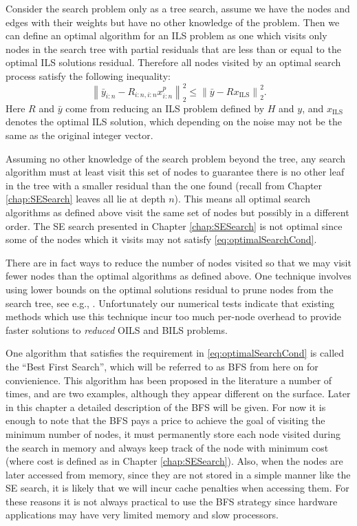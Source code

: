\documentclass[12pt,Bold,letterpaper]{mcgilletdclass}
\begin{document}
Consider the search problem only as a tree search, assume we have the nodes and edges with their weights but have no other knowledge of the problem. Then we can define an optimal algorithm for an ILS problem as one which visits only nodes in the search tree with partial residuals that are less than or equal to the optimal ILS solutions residual. Therefore all nodes visited by an optimal search process satisfy the following inequality:
\begin{equation}\label{eq:optimalSearchCond}
\left \| \bar{y}_{i:n} - R_{i:n,i:n}x_{i:n}^p \right \|_2^2 \le \left \| \bar{y} - Rx_{\scriptscriptstyle{\mathrm{ILS}}} \right \|_2^2.
\end{equation}
Here  $R$ and $\bar{y}$ come from reducing an ILS problem defined by $H$ and $y$, and $x_{\scriptscriptstyle{\mathrm{ILS}}}$ denotes the optimal ILS solution, which depending on the noise may not be the same as the original integer vector. 

Assuming no other knowledge of the search problem beyond the tree, any search algorithm must at least visit this set of nodes to guarantee there is no other leaf in the tree with a smaller residual than the one found (recall from Chapter \ref{chap:SESearch} leaves all lie at depth $n$). This means all optimal search algorithms as defined above visit the same set of nodes but possibly in a different order. The SE search presented in Chapter \ref{chap:SESearch} is not optimal since some of the nodes which it visits may not satisfy \eqref{eq:optimalSearchCond}. 

There are in fact ways to reduce the number of nodes visited so that we may visit fewer nodes than the optimal algorithms as defined above. One technique involves using lower bounds on the optimal solutions residual to prune nodes from the search tree, see e.g., \cite{StoVH08}. Unfortunately our numerical tests indicate that existing methods which use this technique incur too much per-node overhead to provide faster solutions to {\em reduced} OILS and BILS problems.

One algorithm that satisfies the requirement in \eqref{eq:optimalSearchCond} is called the ``Best First Search'', which will be referred to as BFS from here on for convienience. This algorithm has been proposed in the literature a number of times, \cite{FukMU04} and \cite{XuWZW04} are two examples, although they appear different on the surface. Later in this chapter a detailed description of the BFS will be given. For now it is enough to note that the BFS pays a price to achieve the goal of visiting the minimum number of nodes, it must permanently store each node visited during the search in memory and always keep track of the node with minimum cost (where cost is defined as in Chapter \ref{chap:SESearch}). Also, when the nodes are later accessed from memory, since they are not stored in a simple manner like the SE search, it is likely that we will incur cache penalties when accessing them. For these reasons it is not always practical to use the BFS strategy since hardware applications may have very limited memory and slow processors.
\end{document}
